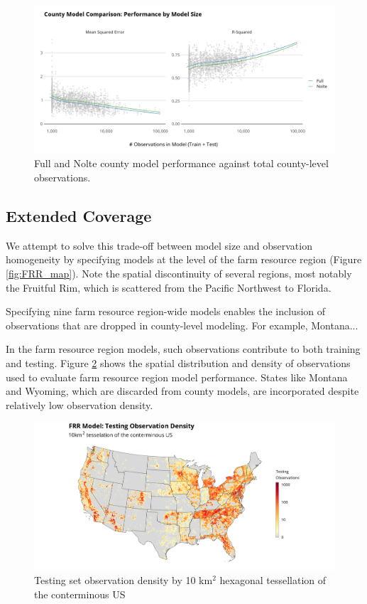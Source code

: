 \documentclass[12pt]{article}
\begin{document}
\begin{figure}
    \centering
    \includegraphics[width=1\textwidth]{exhibits/compare_county_nobs_perf.png}
    \caption{Full and Nolte county model performance against total county-level observations.}
    \label{fig:compare_county_nobs_perf}
\end{figure}

\subsection{Extended Coverage}

We attempt to solve this trade-off between model size and observation homogeneity by specifying models at the level of the farm resource region (Figure \ref{fig:FRR_map}). Note the spatial discontinuity of several regions, most notably the Fruitful Rim, which is scattered from the Pacific Northwest to Florida.

Specifying nine farm resource region-wide models enables the inclusion of observations that are dropped in county-level modeling. For example, Montana...

In the farm resource region models, such observations contribute to both training and testing. Figure \ref{fig:frr_test_density} shows the spatial distribution and density of observations used to evaluate farm resource region model performance. States like Montana and Wyoming, which are discarded from county models, are incorporated despite relatively low observation density. 

\begin{figure}
    \centering
    \includegraphics[width=1\textwidth]{exhibits/frr_test_density.png}
    \caption{Testing set observation density by 10 km$^2$ hexagonal tessellation of the conterminous US}
    \label{fig:frr_test_density}
\end{figure}
\end{document}
